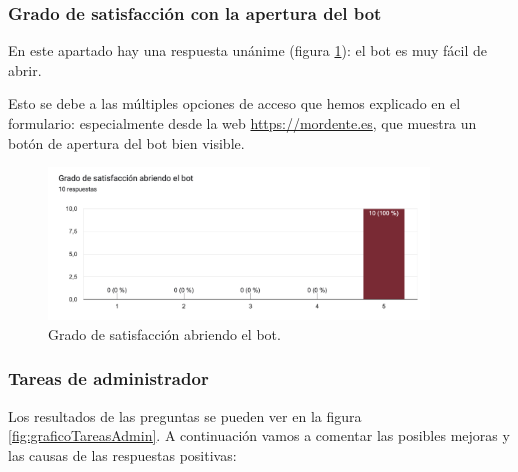 \subsubsection{Grado de satisfacción con la apertura del bot}

En este apartado hay una respuesta unánime (figura \ref{fig:gradoSatisfaccionAbrir}): el bot es muy fácil de abrir.

Esto se debe a las múltiples opciones de acceso que hemos explicado en el formulario: especialmente desde la web \url{https://mordente.es}, que muestra un botón de apertura del bot bien visible.

\begin{figure}[h]
\centering
\includegraphics[width=0.9\textwidth]{imagenes/pruebas/grado_satisfaccion_abriendo.png}
\caption{Grado de satisfacción abriendo el bot.}
\label{fig:gradoSatisfaccionAbrir}
\end{figure}

\subsubsection{Tareas de administrador}

Los resultados de las preguntas se pueden ver en la figura \ref{fig:graficoTareasAdmin}. A continuación vamos a comentar las posibles mejoras y las causas de las respuestas positivas:

